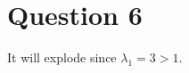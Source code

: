 \documentclass{article}
\begin{document}
\section{Question 6}
It will explode since $\lambda_1=3>1$.










\end{document}
